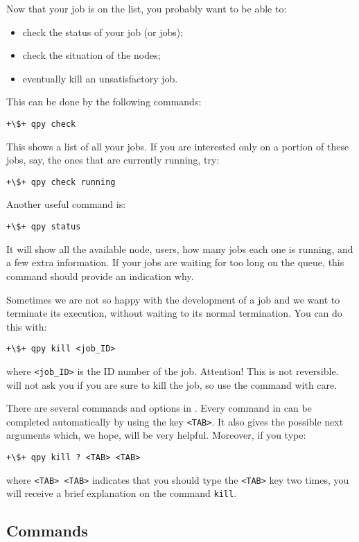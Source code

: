 \documentclass[a4paper,12pt]{article}
\begin{document}
Now that your job is on the list, you probably want to be able to:
\begin{itemize}
\item check the status of your job (or jobs);
\item check the situation of the nodes;
\item eventually kill an unsatisfactory job.
\end{itemize}
This can be done by the following commands:
\begin{lstlisting}[style=BashStyle]
+\$+ qpy check
\end{lstlisting}
This shows a list of all your jobs.
If you are interested only on a portion of these jobs, say, the ones that are currently running, try:
\begin{lstlisting}[style=BashStyle]
+\$+ qpy check running
\end{lstlisting}
Another useful \qpy{} command is:
\begin{lstlisting}[style=BashStyle]
+\$+ qpy status
\end{lstlisting}
It will show all the available node, users, how many jobs each one is running, and a few extra information.
If your jobs are waiting for too long on the queue, this command should provide an indication why.

Sometimes we are not so happy with the development of a job and we want to terminate its execution, without waiting to its normal termination.
You can do this with:
\begin{lstlisting}[style=BashStyle]
+\$+ qpy kill <job_ID>
\end{lstlisting}
where \texttt{<job\_ID>} is the ID number of the job.
Attention! This is not reversible.
\qpy{} will not ask you if you are sure to kill the job, so use the command with care.

There are several commands and options in \qpy{}.
Every command in \qpy{} can be completed automatically by using the key \texttt{<TAB>}.
It also gives the possible next arguments which, we hope, will be very helpful.
Moreover, if you type:
\begin{lstlisting}[style=BashStyle]
+\$+ qpy kill ? <TAB> <TAB>
\end{lstlisting}
where \texttt{<TAB> <TAB>} indicates that you should type the \texttt{<TAB>} key two times, you will receive a brief explanation on the command \texttt{kill}.

\subsection{Commands}\label{sec:user_commands}
\end{document}
